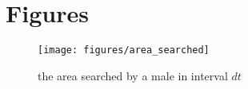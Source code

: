 \documentclass[a4paper,11pt]{article}
\begin{document}
\section{Figures}

\begin{figure}[h!]
\centering
\texttt{[image: figures/area\_searched]}
\caption{the area searched by a male in interval $dt$}
\label{fig:area searched figure}
\end{figure}
\clearpage


\end{document}
